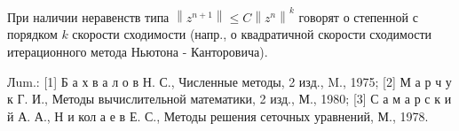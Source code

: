 \documentclass[10pt]{article}
\begin{document}
При наличии неравенств типа $\left\|z^{n+1}\right\| \leqslant C\left\|z^{n}\right\|^{k}$ говорят о степенной с порядком $k$ скорости сходимости (напр., о квадратичной скорости сходимости итерационного метода Ньютона - Канторовича).



Лum.: [1] Б а х в а л о в Н. С., Численные методы, 2 изд., M., 1975; [2] М а р ч у к Г. И., Методы вычислительной математики, 2 изд., М., 1980; [3] С а м а р с к и й А. А., Н и кол а е в Е. С., Методы решения сеточных уравнений, М., 1978.
\end{document}
